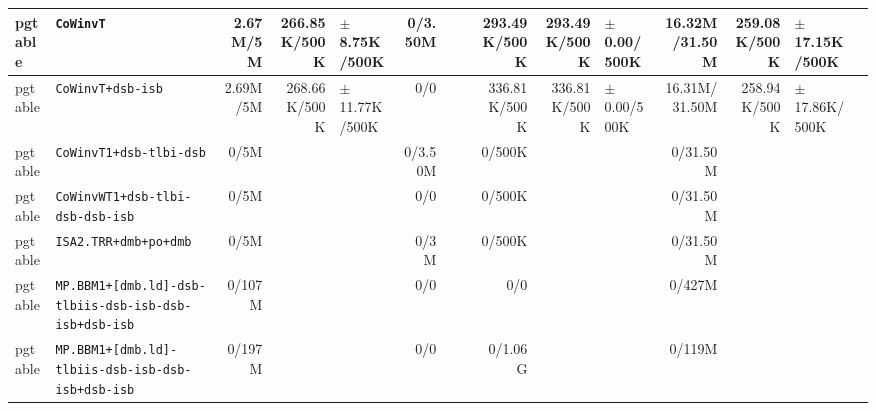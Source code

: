 \begin{tabular}{l l  | r r l | r r l | r r l | r r l l}
         pgtable &                                             \verb|CoWinvT| &       2.67M/5M &          266.85K/500K &  $\pm$ 8.75K/500K &        0/3.50M &                       &                 &   293.49K/500K &          293.49K/500K &   $\pm$ 0.00/500K &  16.32M/31.50M &          259.08K/500K & $\pm$ 17.15K/500K & \\ \hline 
         pgtable &                                     \verb|CoWinvT+dsb-isb| &       2.69M/5M &          268.66K/500K & $\pm$ 11.77K/500K &            0/0 &                       &                 &   336.81K/500K &          336.81K/500K &   $\pm$ 0.00/500K &  16.31M/31.50M &          258.94K/500K & $\pm$ 17.86K/500K & \\ \hline 
         pgtable &                               \verb|CoWinvT1+dsb-tlbi-dsb| &           0/5M &                       &                   &        0/3.50M &                       &                 &         0/500K &                       &                   &       0/31.50M &                       &                   & \\ \hline 
         pgtable &                      \verb|CoWinvWT1+dsb-tlbi-dsb-dsb-isb| &           0/5M &                       &                   &            0/0 &                       &                 &         0/500K &                       &                   &       0/31.50M &                       &                   & \\ \hline 
         pgtable &                                 \verb|ISA2.TRR+dmb+po+dmb| &           0/5M &                       &                   &           0/3M &                       &                 &         0/500K &                       &                   &       0/31.50M &                       &                   & \\ \hline 
         pgtable & \verb|MP.BBM1+[dmb.ld]-dsb-tlbiis-dsb-isb-dsb-isb+dsb-isb| &         0/107M &                       &                   &            0/0 &                       &                 &            0/0 &                       &                   &         0/427M &                       &                   & \\ \hline 
         pgtable &     \verb|MP.BBM1+[dmb.ld]-tlbiis-dsb-isb-dsb-isb+dsb-isb| &         0/197M &                       &                   &            0/0 &                       &                 &        0/1.06G &                       &                   &         0/119M &                       &                   & \\ \hline 

\end{tabular}

